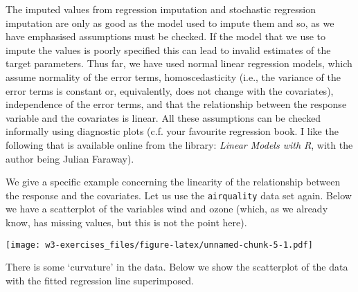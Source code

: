 \documentclass[
]{article}
\newenvironment{Shaded}{\begin{snugshade}}{\end{snugshade}}
\newcommand{\DataTypeTok}[1]{\textcolor[rgb]{0.13,0.29,0.53}{#1}}
\newcommand{\DecValTok}[1]{\textcolor[rgb]{0.00,0.00,0.81}{#1}}
\newcommand{\KeywordTok}[1]{\textcolor[rgb]{0.13,0.29,0.53}{\textbf{#1}}}
\newcommand{\NormalTok}[1]{#1}
\newcommand{\OperatorTok}[1]{\textcolor[rgb]{0.81,0.36,0.00}{\textbf{#1}}}
\newcommand{\StringTok}[1]{\textcolor[rgb]{0.31,0.60,0.02}{#1}}
\begin{document}
The imputed values from regression imputation and stochastic regression
imputation are only as good as the model used to impute them and so, as
we have emphasised assumptions must be checked. If the model that we use
to impute the values is poorly specified this can lead to invalid
estimates of the target parameters. Thus far, we have used normal linear
regression models, which assume normality of the error terms,
homoscedasticity (i.e., the variance of the error terms is constant or,
equivalently, does not change with the covariates), independence of the
error terms, and that the relationship between the response variable and
the covariates is linear. All these assumptions can be checked
informally using diagnostic plots (c.f. your favourite regression book.
I like the following that is available online from the library:
\emph{Linear Models with R}, with the author being Julian Faraway).

We give a specific example concerning the linearity of the relationship
between the response and the covariates. Let us use the
\texttt{airquality} data set again. Below we have a scatterplot of the
variables wind and ozone (which, as we already know, has missing values,
but this is not the point here).

\begin{Shaded}
\end{Shaded}

\texttt{[image: w3-exercises\_files/figure-latex/unnamed-chunk-5-1.pdf]}

There is some `curvature' in the data. Below we show the scatterplot of
the data with the fitted regression line superimposed.

\begin{Shaded}
\end{Shaded}
\end{document}
